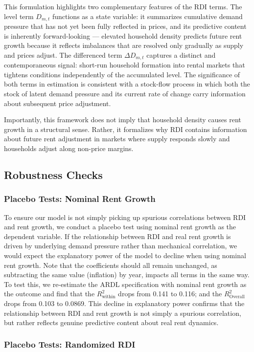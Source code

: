 \documentclass[pdflatex,sn-apa]{sn-jnl}%
\theoremstyle{thmstyleone}%
\theoremstyle{thmstyletwo}%
\theoremstyle{thmstylethree}%
\begin{document}
This formulation highlights two complementary features of the RDI terms. The 
level term $D_{m,t}$ functions as a state variable: it summarizes cumulative 
demand pressure that has not yet been fully reflected in prices, and its 
predictive content is inherently forward-looking --- elevated household density 
predicts future rent growth because it reflects imbalances that are resolved only 
gradually as supply and prices adjust. The differenced term $\Delta D_{m,t}$ 
captures a distinct and contemporaneous signal: short-run household formation 
into rental markets that tightens conditions independently of the accumulated 
level. The significance of both terms in estimation is consistent with a 
stock-flow process in which both the stock of latent demand pressure and its 
current rate of change carry information about subsequent price adjustment.

Importantly, this framework does not imply that household density causes rent 
growth in a structural sense. Rather, it formalizes why RDI contains information 
about future rent adjustment in markets where supply responds slowly and 
households adjust along non-price margins.
\subsection{Robustness Checks}

\subsubsection{Placebo Tests: Nominal Rent Growth}
To ensure our model is not simply picking up spurious correlations between RDI and rent growth, we conduct a placebo test using nominal rent growth as the dependent variable. If the relationship between RDI and real rent growth is driven by underlying demand pressure rather than mechanical correlation, we would expect the explanatory power of the model to decline when using nominal rent growth. Note that the coefficients should all remain unchanged, as subtracting the same value (inflation) by year, impacts all terms in the same way.  To test this, we re-estimate the ARDL specification with nominal rent growth as the outcome and find that the ${R}^2_\text{within}$ drops from 0.141 to 0.116; and the ${R}^2_\text{Overall}$ drops from 0.103 to 0.0869. This decline in explanatory power confirms that the relationship between RDI and rent growth is not simply a spurious correlation, but rather reflects genuine predictive content about real rent dynamics.
\subsubsection{Placebo Tests: Randomized RDI}
\end{document}
